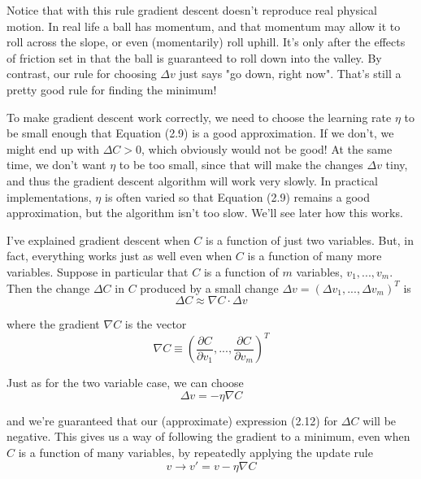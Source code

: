 \documentclass[a4paper,12pt]{report}%
\begin{document}
Notice that with this rule gradient descent doesn't reproduce real physical motion. In real life a ball has momentum, and that momentum may allow it to roll across the slope, or even (momentarily) roll uphill. It's only after the effects of friction set in that the ball is guaranteed to roll down into the valley. By contrast, our rule for choosing $\Delta v$ just says "go down, right now". That's still a pretty good rule for finding the minimum!

To make gradient descent work correctly, we need to choose the learning rate $\eta$ to be small enough that Equation (2.9) is a good approximation. If we don't, we might end up with $\Delta C > 0$, which obviously would not be good! At the same time, we don't want $\eta$ to be too small, since that will make the changes $\Delta v$ tiny, and thus the gradient descent algorithm will work very slowly. In practical implementations, $\eta$ is often varied so that Equation (2.9) remains a good approximation, but the algorithm isn't too slow. We'll see later how this works.

I've explained gradient descent when $C$ is a function of just two variables. But, in fact, everything works just as well even when $C$ is a function of many more variables. Suppose in particular that $C$ is a function of $m$ variables, $v_{1}, ..., v_{m}$. Then the change $\Delta C$ in $C$ produced by a small change $\Delta v = (\Delta v_{1}, ..., \Delta v_{m})^{T}$ is
\begin{equation}
 \Delta C \approx \nabla C \cdot \Delta v
\end{equation}

where the gradient $\nabla C$ is the vector
\begin{equation}
\nabla C \equiv \left( \frac{\partial C}{\partial v_{1}}, ... , \frac{\partial C}{\partial v_{m}} \right)^{T}
\end{equation}

Just as for the two variable case, we can choose
\begin{equation}
\Delta v = − \eta \nabla C
\end{equation}

and we're guaranteed that our (approximate) expression (2.12) for $\Delta C$ will be negative. This gives us a way of following the gradient to a minimum, even when $C$ is a function of many variables, by repeatedly applying the update rule
\begin{equation}
v \rightarrow v' = v - \eta \nabla C
\end{equation}
\end{document}
